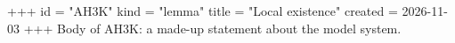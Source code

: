 +++
id = "AH3K"
kind = "lemma"
title = "Local existence"
created = 2026-11-03
+++
Body of AH3K: a made-up statement about the model system.
